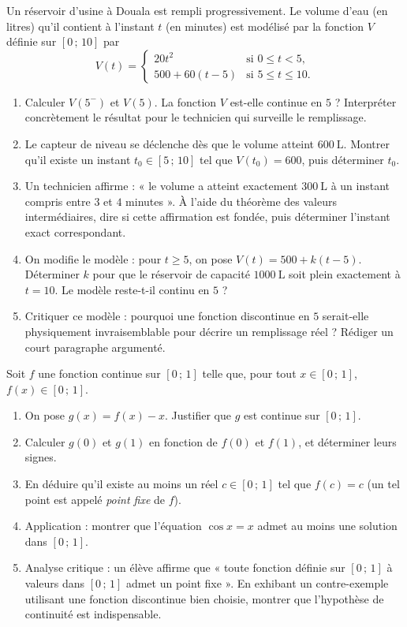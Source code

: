 \documentclass[11pt]{article}
\begin{document}
\begin{exercice}
Un réservoir d'usine à Douala est rempli progressivement. Le volume d'eau (en litres) qu'il contient à l'instant $t$ (en minutes) est modélisé par la fonction $V$ définie sur $[0\,;\,10]$ par
\[ V(t)=\begin{cases} 20t^2 & \text{si } 0\leq t<5,\\[4pt] 500+60(t-5) & \text{si } 5\leq t\leq 10. \end{cases} \]
\begin{enumerate}
\item Calculer $V(5^-)$ et $V(5)$. La fonction $V$ est-elle continue en $5$ ? Interpréter concrètement le résultat pour le technicien qui surveille le remplissage.
\item Le capteur de niveau se déclenche dès que le volume atteint $\SI{600}{\liter}$. Montrer qu'il existe un instant $t_0\in[5\,;\,10]$ tel que $V(t_0)=600$, puis déterminer $t_0$.
\item Un technicien affirme : « le volume a atteint exactement $\SI{300}{\liter}$ à un instant compris entre $3$ et $4$ minutes ». À l'aide du théorème des valeurs intermédiaires, dire si cette affirmation est fondée, puis déterminer l'instant exact correspondant.
\item On modifie le modèle : pour $t\geq 5$, on pose $V(t)=500+k(t-5)$. Déterminer $k$ pour que le réservoir de capacité $\SI{1000}{\liter}$ soit plein exactement à $t=10$. Le modèle reste-t-il continu en $5$ ?
\item Critiquer ce modèle : pourquoi une fonction discontinue en $5$ serait-elle physiquement invraisemblable pour décrire un remplissage réel ? Rédiger un court paragraphe argumenté.
\end{enumerate}
\end{exercice}

\begin{exercice}
Soit $f$ une fonction continue sur $[0\,;\,1]$ telle que, pour tout $x\in[0\,;\,1]$, $f(x)\in[0\,;\,1]$.
\begin{enumerate}
\item On pose $g(x)=f(x)-x$. Justifier que $g$ est continue sur $[0\,;\,1]$.
\item Calculer $g(0)$ et $g(1)$ en fonction de $f(0)$ et $f(1)$, et déterminer leurs signes.
\item En déduire qu'il existe au moins un réel $c\in[0\,;\,1]$ tel que $f(c)=c$ (un tel point est appelé \emph{point fixe} de $f$).
\item Application : montrer que l'équation $\cos x = x$ admet au moins une solution dans $[0\,;\,1]$.
\item Analyse critique : un élève affirme que « toute fonction définie sur $[0\,;\,1]$ à valeurs dans $[0\,;\,1]$ admet un point fixe ». En exhibant un contre-exemple utilisant une fonction discontinue bien choisie, montrer que l'hypothèse de continuité est indispensable.
\end{enumerate}
\end{exercice}
\end{document}
